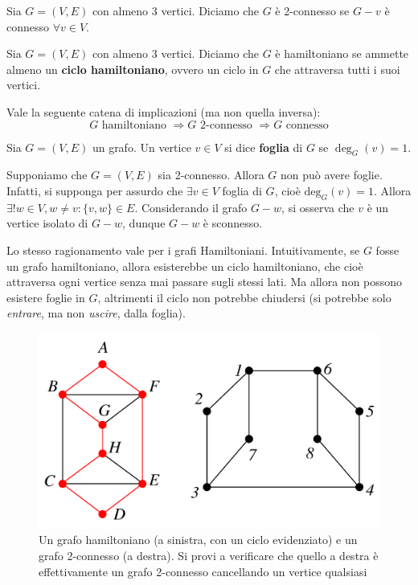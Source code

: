 \documentclass[oneside]{book}
\begin{document}
\begin{tcolorbox}[colback=yellow!30, colframe=yellow!30!black, title=Grafo 2-connesso]
Sia $G=(V,E)$ con almeno 3 vertici. Diciamo che $G$ è 2-connesso se $G-v$ è
connesso $\forall v \in V$.
\end{tcolorbox}

\begin{tcolorbox}[colback=yellow!30, colframe=yellow!30!black, title=Grafo Hamiltoniano]
Sia $G=(V,E)$ con almeno 3 vertici. Diciamo che $G$ è hamiltoniano se ammette
almeno un \textbf{ciclo hamiltoniano}, ovvero un ciclo in $G$ che attraversa
tutti i suoi vertici.
\end{tcolorbox}
\noindent Vale la seguente catena di implicazioni (ma non quella inversa):
\[ G \text{ hamiltoniano } \Longrightarrow G \text{ 2-connesso } \Longrightarrow G \text{ connesso} \]
\begin{tcolorbox}[colback=yellow!30, colframe=yellow!30!black, title=Foglia]
Sia $G=(V,E)$ un grafo. Un vertice $v\in V$ si dice \textbf{foglia} di $G$
se $\deg_G(v)=1$.
\end{tcolorbox}
\noindent Supponiamo che $G=(V,E)$ sia 2-connesso. Allora $G$ non
può avere foglie. Infatti, si supponga per assurdo che $\exists v\in V$
foglia di $G$, cioè $\text{deg}_G(v)=1$. Allora $\exists!w\in V,w\not=v:\{v,w\}\in E$.
Considerando il grafo $G-w$, si osserva che $v$ è un vertice isolato di
$G-w$, dunque $G-w$ è sconnesso.
\begin{osservaz}
Lo stesso ragionamento vale per i grafi Hamiltoniani. Intuitivamente,
se $G$ fosse un grafo hamiltoniano, allora esisterebbe un ciclo hamiltoniano,
che cioè attraversa ogni vertice senza mai passare sugli stessi lati.
Ma allora non possono esistere foglie in $G$, altrimenti il ciclo
non potrebbe chiudersi (si potrebbe solo \emph{entrare}, ma non \emph{uscire}, dalla
foglia).
\end{osservaz}

\begin{figure}[H]
\centering
\includegraphics[scale = 0.4]{figures/2-conn-vs-hamilton.pdf}
\caption{Un grafo hamiltoniano (a sinistra, con un ciclo evidenziato) e un grafo 2-connesso (a destra).
Si provi a verificare che quello a destra è effettivamente un grafo 2-connesso
cancellando un vertice qualsiasi}
\end{figure}
\end{document}
